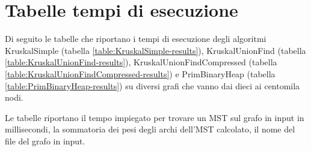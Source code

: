 \appendix
\section{Tabelle tempi di esecuzione}
\label{cap:runtime-tables}

Di seguito le tabelle che riportano i tempi di esecuzione degli algoritmi KruskalSimple (tabella \ref{table:KruskalSimple-results}), KruskalUnionFind (tabella \ref{table:KruskalUnionFind-results}), KruskalUnionFindCompressed  (tabella \ref{table:KruskalUnionFindCompressed-results}) e PrimBinaryHeap (tabella \ref{table:PrimBinaryHeap-results}) su diversi grafi che vanno dai dieci ai centomila nodi.

Le tabelle riportano il tempo impiegato per trovare un MST sul grafo in input in millisecondi, la sommatoria dei pesi degli archi dell'MST calcolato, il nome del file del grafo in input.

